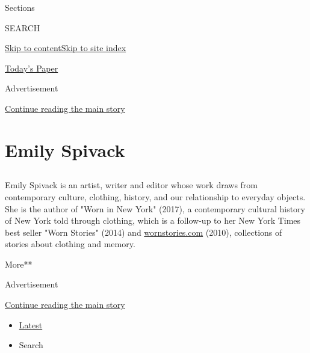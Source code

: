 Sections

SEARCH

\protect\hyperlink{site-content}{Skip to
content}\protect\hyperlink{site-index}{Skip to site index}

\href{https://myaccount.nytimes3xbfgragh.onion/auth/login?response_type=cookie\&client_id=vi}{}

\href{https://www.nytimes3xbfgragh.onion/section/todayspaper}{Today's
Paper}

Advertisement

\protect\hyperlink{after-top}{Continue reading the main story}

\hypertarget{emily-spivack}{%
\section{Emily Spivack}\label{emily-spivack}}

\subsection{}

Emily Spivack is an artist, writer and editor whose work draws from
contemporary culture, clothing, history, and our relationship to
everyday objects. She is the author of "Worn in New York" (2017), a
contemporary cultural history of New York told through clothing, which
is a follow-up to her New York Times best seller "Worn Stories" (2014)
and \href{http://wornstories.com/}{wornstories.com} (2010), collections
of stories about clothing and memory.

More**

Advertisement

\protect\hyperlink{after-mid1}{Continue reading the main story}

\begin{itemize}
\tightlist
\item
  \protect\hyperlink{stream-panel}{Latest}
\item
  Search
\end{itemize}

